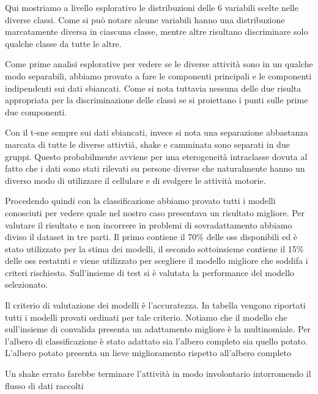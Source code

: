 %
Qui mostriamo a livello esplorativo le distribuzioni delle 6 variabili scelte nelle diverse classi. Come si può notare alcune variabili hanno una distribuzione marcatamente diversa in ciascuna classe, mentre altre risultano discriminare solo qualche classe da tutte le altre.
%

%
Come prime analisi esplorative per vedere se le diverse attività sono in un qualche modo separabili, abbiamo provato a fare le componenti principali e le componenti indipendenti sui dati sbiancati. Come si nota tuttavia nessuna delle due risulta appropriata per la discriminazione delle classi se si proiettano i punti sulle prime due componenti.
%

%
Con il t-sne sempre sui dati sbiancati, invece si nota una separazione abbastanza marcata di tutte le diverse attivtià, shake e camminata sono separati in due gruppi. Questo probabilmente avviene per una eterogeneità intraclasse dovuta al fatto che i dati sono stati rilevati su persone diverse che naturalmente hanno un diverso modo di utilizzare il cellulare e di svolgere le attività motorie. 
%

%
Procedendo quindi con la classificazione abbiamo provato tutti i modelli conosciuti per vedere quale nel nostro caso presentava un risultato migliore. Per valutare il risultato e non incorrere in problemi di sovradattamento abbiamo diviso il dataset in tre parti. Il primo contiene il 70\% delle oss disponibili ed è stato utilizzato per la stima dei modelli, il secondo sottoinsieme contiene il 15\% delle oss restatnti e viene utilizzato per scegliere il modello migliore che soddifa  i criteri rischiesto. Sull'insieme di test si è valutata la performance del modello selezionato. 
%

%
Il criterio di valutazione dei modelli è l'accuratezza. In tabella vengono riportati tutti i modelli provati ordinati per tale criterio. Notiamo che il modello che sull'insieme di convalida presenta un adattamento migliore è la multinomiale. Per l'albero di classificazione è stato adattato sia l'albero completo sia quello potato. L'albero potato presenta un lieve miglioramento rispetto all'albero completo
%

%
Un shake errato farebbe terminare l\rq{}attività in modo involontario intorromendo il flusso di dati raccolti